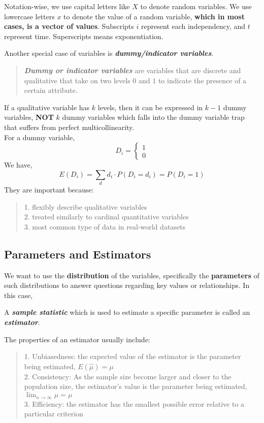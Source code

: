 Notation-wise, we use capital letters like $X$ to denote random variables. We use lowercase letters $x$ to denote the value of a random variable, \textbf{which in most cases, is a vector of values}. Subscripts $i$ represent each independency, and $t$ represent time. Superscripts means exponentiation.

Another special case of variables is \textbf{\textit{dummy/indicator variables}}.
\begin{quote}
    \textbf{\textit{Dummy or indicator variables}} are variables that are discrete and qualitative that take on two levels $0$ and $1$ to indicate the presence of a certain attribute.
\end{quote}
If a qualitative variable has $k$ levels, then it can be expressed in $k-1$ dummy variables, \textbf{NOT} $k$ dummy variables which falls into the dummy variable trap that suffers from perfect multicollinearity. \\
For a dummy variable,
$$D_i = \begin{cases}
    1 \\
    0
\end{cases}$$
We have,
$$E(D_i) = \sum_d d_i \cdot P(D_i = d_i) = P(D_i = 1)$$
They are important because:
\begin{quote}
    1. flexibly describe qualitative variables \\
    2. treated similarly to cardinal quantitative variables \\
    3. most common type of data in real-world datasets
\end{quote}

\subsection{Parameters and Estimators}
We want to use the \textbf{distribution} of the variables, specifically the \textbf{parameters} of such distributions to answer questions regarding key values or relationships. In this case, 
\begin{definition}
    A \textbf{\textit{sample statistic}} which is used to estimate a specific parameter is called an \textbf{\textit{estimator}}.
\end{definition}
The properties of an estimator usually include:
\begin{quote}
    1. Unbiasedness: the expected value of the estimator is the parameter being estimated, $E(\hat{\mu}) = \mu$ \\
    2. Consistency: As the sample size become larger and closer to the population size, the estimator's value is the parameter being estimated, $\displaystyle \lim_{n \to \infty} \hat{\mu} = \mu$ \\
    3. Efficiency: the estimator has the smallest possible error relative to a particular criterion
\end{quote}

